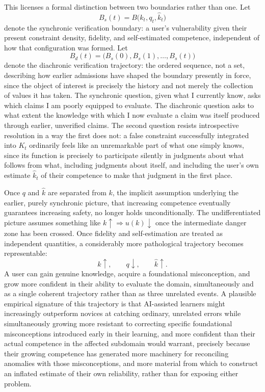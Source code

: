 \documentclass[11pt]{article}
\begin{document}
This licenses a formal distinction between two boundaries rather than one. Let
\[
B_s(t) = B\bigl(k_t, q_t, \hat{k}_t\bigr)
\]
denote the synchronic verification boundary: a user's vulnerability given their present constraint density, fidelity, and self-estimated competence, independent of how that configuration was formed. Let
\[
B_d(t) = \bigl(B_s(0), B_s(1), \ldots, B_s(t)\bigr)
\]
denote the diachronic verification trajectory: the ordered sequence, not a set, describing how earlier admissions have shaped the boundary presently in force, since the object of interest is precisely the history and not merely the collection of values it has taken. The synchronic question, given what I currently know, asks which claims I am poorly equipped to evaluate. The diachronic question asks to what extent the knowledge with which I now evaluate a claim was itself produced through earlier, unverified claims. The second question resists introspective resolution in a way the first does not: a false constraint successfully integrated into $K_t$ ordinarily feels like an unremarkable part of what one simply knows, since its function is precisely to participate silently in judgments about what follows from what, including judgments about itself, and including the user's own estimate $\hat{k}_t$ of their competence to make that judgment in the first place.

Once $q$ and $\hat{k}$ are separated from $k$, the implicit assumption underlying the earlier, purely synchronic picture, that increasing competence eventually guarantees increasing safety, no longer holds unconditionally. The undifferentiated picture assumes something like $k \uparrow \Rightarrow u(k) \downarrow$ once the intermediate danger zone has been crossed. Once fidelity and self-estimation are treated as independent quantities, a considerably more pathological trajectory becomes representable:
\[
k \uparrow, \qquad q \downarrow, \qquad \hat{k} \uparrow.
\]
A user can gain genuine knowledge, acquire a foundational misconception, and grow more confident in their ability to evaluate the domain, simultaneously and as a single coherent trajectory rather than as three unrelated events. A plausible empirical signature of this trajectory is that AI-assisted learners might increasingly outperform novices at catching ordinary, unrelated errors while simultaneously growing more resistant to correcting specific foundational misconceptions introduced early in their learning, and more confident than their actual competence in the affected subdomain would warrant, precisely because their growing competence has generated more machinery for reconciling anomalies with those misconceptions, and more material from which to construct an inflated estimate of their own reliability, rather than for exposing either problem.
\end{document}
